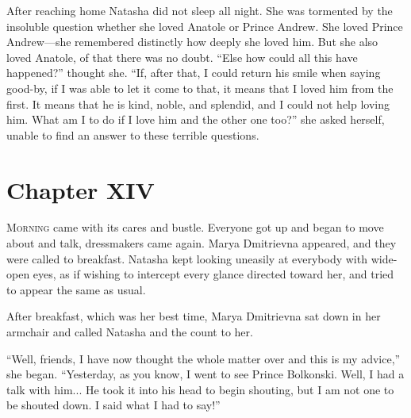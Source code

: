 After reaching home Natasha did not sleep all night. She was
tormented by the insoluble question whether she loved Anatole or
Prince Andrew.  She loved Prince Andrew---she remembered
distinctly how deeply she loved him. But she also loved Anatole,
of that there was no doubt. ``Else how could all this have
happened?'' thought she. ``If, after that, I could return his
smile when saying good-by, if I was able to let it come to that,
it means that I loved him from the first. It means that he is
kind, noble, and splendid, and I could not help loving him. What
am I to do if I love him and the other one too?'' she asked
herself, unable to find an answer to these terrible questions.


\chapter*{Chapter XIV}
\ifaudio     
{} 
\fi

\lettrine[lines=2, loversize=0.3, lraise=0]{\initfamily M}{orning}
came with its cares and bustle. Everyone got up and began
to move about and talk, dressmakers came again. Marya Dmitrievna
appeared, and they were called to breakfast. Natasha kept looking
uneasily at everybody with wide-open eyes, as if wishing to
intercept every glance directed toward her, and tried to appear
the same as usual.

After breakfast, which was her best time, Marya Dmitrievna sat
down in her armchair and called Natasha and the count to her.

``Well, friends, I have now thought the whole matter over and
this is my advice,'' she began. ``Yesterday, as you know, I went
to see Prince Bolkonski. Well, I had a talk with him... He took
it into his head to begin shouting, but I am not one to be
shouted down. I said what I had to say!''


